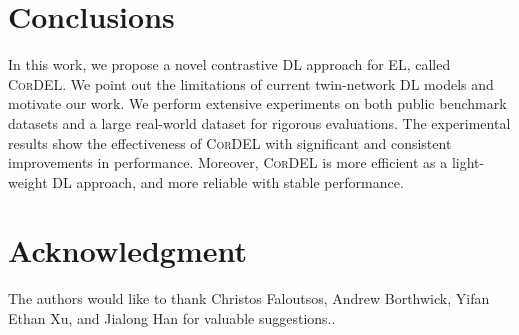 \documentclass[conference]{IEEEtran}
\begin{document}
\section{Conclusions}

In this work, we propose a novel contrastive DL approach for EL, called \textsc{CorDEL}. We point out the limitations of current twin-network DL models and motivate our work. We perform extensive experiments on both public benchmark datasets and a large real-world dataset for rigorous evaluations. The experimental results show the effectiveness of \textsc{CorDEL} with significant and consistent improvements in performance. Moreover, \textsc{CorDEL} is more efficient as a light-weight DL approach, and more reliable with stable performance.

\section*{Acknowledgment}

The authors would like to thank Christos Faloutsos, Andrew Borthwick, Yifan Ethan Xu, and Jialong Han for valuable suggestions..
\end{document}
